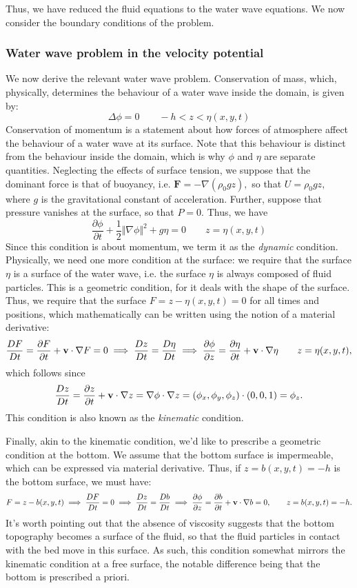 \documentclass[10pt,reqno,oneside,a4paper]{article}
\begin{document}
Thus, we have reduced the fluid equations to the water wave equations. We now consider the boundary conditions of the problem.

\subsubsection{Water wave problem in the velocity potential}
We now derive the relevant water wave problem. Conservation of mass, which, physically, determines the behaviour of a water wave inside the domain, is given by:
\[
\Delta \phi = 0 \qquad -h <z < \eta(x,y,t)
\]
Conservation of momentum is a statement about how forces of atmosphere affect the behaviour of a water wave at its surface. Note that this behaviour is distinct from the behaviour inside the domain, which is why $\phi$ and $\eta$ are separate quantities. Neglecting the effects of surface tension, we suppose that the dominant force is that of buoyancy, i.e. $\textbf{F} = - \nabla(\rho_0 gz),$ so that $U = \rho_0 g z,$ where $g$ is the gravitational constant of acceleration. Further, suppose that pressure vanishes at the surface, so that $P = 0.$ Thus, we have 
\[ 
\frac{\partial \phi}{\partial t} + \frac{1}{2} \Vert \nabla \phi \Vert^2 + g \eta = 0 \qquad z = \eta(x,y,t)
\]
Since this condition is about momentum, we term it as the \textit{dynamic} condition. 
Physically, we need one more condition at the surface: we require that the surface $\eta$ is a surface of the water wave, i.e. the surface $\eta$ is always composed of fluid particles. This is a geometric condition, for it deals with the shape of the surface. Thus, we require that the surface $F = z - \eta(x,y,t) = 0 $ for all times and positions, which mathematically can be written using the notion of a material derivative:
\[ 
\frac{DF}{Dt} = \frac{\partial F}{\partial t} + {\bf v} \cdot \nabla F = 0 \implies \frac{Dz}{Dt} = \frac{D\eta}{Dt}  \implies \frac{\partial \phi}{\partial z} =  \frac{\partial \eta}{\partial t} + {\bf v} \cdot \nabla \eta \qquad z = \eta(x,y,t),
\]
which follows since \[ \dfrac{Dz}{Dt} = \dfrac{\partial z}{\partial t} + {\bf v} \cdot \nabla z = \nabla \phi \cdot \nabla z = (\phi_x, \phi_y, \phi_z) \cdot (0,0,1) = \phi_z. \]
This condition is also known as the \textit{kinematic} condition. 

Finally, akin to the kinematic condition, we'd like to prescribe a geometric condition at the bottom. We assume that the bottom surface is impermeable, which can be expressed via material derivative. Thus, if $z = b(x,y,t) = -h$ is the bottom surface, we must have:
\[ 
F = z - b(x,y,t) \implies \frac{DF}{Dt} = 0 \implies \frac{Dz}{Dt} = \frac{D b}{Dt} \implies \frac{\partial \phi}{\partial z} = \frac{\partial b}{\partial t} + {\bf v} \cdot \nabla b = 0, \qquad z = b(x,y,t)= - h.
\]
It's worth pointing out that the absence of viscosity suggests that the bottom topography becomes a surface of the fluid, so that the fluid particles in contact with the bed move in this surface. As such, this condition somewhat mirrors the kinematic condition at a free surface, the notable difference being that the bottom is prescribed a priori. 
\end{document}
